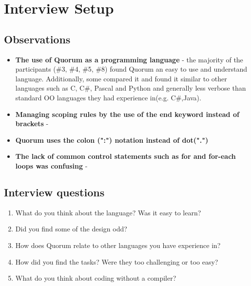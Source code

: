 \section{Interview Setup}

\subsection{Observations}
\begin{itemize}
\item \textbf{The use of Quorum as a programming language} - the majority of the participants (\#3, \#4, \#5, \#8) found Quorum an easy to use and understand language. Additionally, some compared it and found it similar to other languages such as C, C\#, Pascal and Python and generally less verbose than standard OO languages they had experience in(e.g. C\#,Java). 
\item \textbf{Managing scoping rules by the use of the end keyword instead of brackets} - 
\item \textbf{Quorum uses the colon (":") notation instead of dot(".")}
\item \textbf{The lack of common control statements such as for and for-each loops was confusing} - 
\end{itemize}


\subsection{Interview questions}
\begin{enumerate}
\item What do you think about the language? Was it easy to learn?
\item Did you find some of the design odd?
\item How does Quorum relate to other languages you have experience in?
\item How did you find the tasks? Were they too challenging or too easy?
\item What do you think about coding without a compiler?
\end{enumerate}	